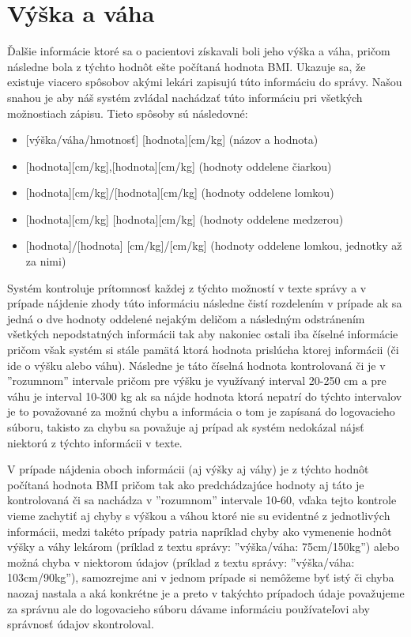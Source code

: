 \section{Výška a váha}

Ďalšie informácie ktoré sa o pacientovi získavali boli jeho výška a váha, pričom následne bola z týchto hodnôt ešte počítaná hodnota BMI. Ukazuje sa, že existuje viacero spôsobov akými lekári zapisujú túto informáciu do správy. Našou snahou je aby náš systém zvládal nachádzať túto informáciu pri všetkých možnostiach zápisu. Tieto spôsoby sú následovné:

\begin{itemize}
	\item {[výška/váha/hmotnosť]} {[hodnota]}{[cm/kg]} (názov a hodnota)
	\item {[hodnota]}{[cm/kg]},{[hodnota]}{[cm/kg]} (hodnoty oddelene čiarkou)
	\item {[hodnota]}{[cm/kg]}/{[hodnota]}{[cm/kg]} (hodnoty oddelene lomkou)
	\item {[hodnota]}{[cm/kg]} {[hodnota]}{[cm/kg]} (hodnoty oddelene medzerou)
	\item {[hodnota]}/{[hodnota]} {[cm/kg]}/{[cm/kg]} (hodnoty oddelene lomkou, jednotky až za nimi)
\end{itemize}   

Systém kontroluje prítomnosť každej z týchto možností v texte správy a v prípade nájdenie zhody túto informáciu následne čistí rozdelením v prípade ak sa jedná o dve hodnoty oddelené nejakým deličom a následným odstránením všetkých nepodstatných informácii tak aby nakoniec ostali iba číselné informácie pričom však systém si stále pamätá ktorá hodnota prislúcha ktorej informácii (či ide o výšku alebo váhu). Následne je táto číselná hodnota kontrolovaná či je v ''rozumnom'' intervale pričom pre výšku je využívaný interval 20-250 cm a pre váhu je interval 10-300 kg ak sa nájde hodnota ktorá nepatrí do týchto intervalov je to považované za možnú chybu a informácia o tom je zapísaná do logovacieho súboru, takisto za chybu sa považuje aj prípad ak systém nedokázal nájsť niektorú z týchto informácii v texte.

V prípade nájdenia oboch informácii (aj výšky aj váhy) je z týchto hodnôt počítaná hodnota BMI pričom tak ako predchádzajúce hodnoty aj táto je kontrolovaná či sa nachádza v ''rozumnom'' intervale 10-60, vďaka tejto kontrole vieme zachytiť aj chyby s výškou a váhou ktoré nie su evidentné z jednotlivých informácii, medzi takéto prípady patria napríklad chyby ako vymenenie hodnôt výšky a váhy lekárom (príklad z textu správy: ''výška/váha: 75cm/150kg'') alebo možná chyba v niektorom údajov (príklad z textu správy: ''výška/váha: 103cm/90kg''), samozrejme ani v jednom prípade si nemôžeme byť istý či chyba naozaj nastala a aká konkrétne je a preto v takýchto prípadoch údaje považujeme za správnu ale do logovacieho súboru dávame informáciu používateľovi aby správnosť údajov skontroloval. 

